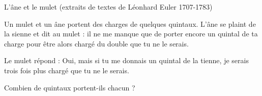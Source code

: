 \exo \qquad \og L’âne et le mulet \fg{} (extraits de textes de Léonhard Euler 1707-1783)


Un mulet et un âne portent des charges de quelques quintaux. L'âne se plaint de la sienne et dit au mulet : \og il ne me manque que de porter encore un quintal de ta charge pour être alors chargé du double que tu ne le serais. \fg{}

Le mulet répond : \og Oui, mais si tu me donnais un quintal de la tienne, je serais trois fois plus chargé que tu ne le serais.  \fg{}

Combien de quintaux portent-ils chacun ?
